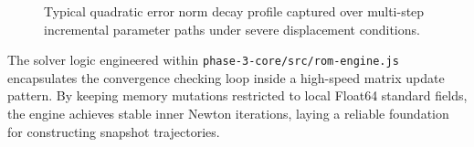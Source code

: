 \begin{figure}[H]
    \centering
    \vspace{4cm}
    \caption{Typical quadratic error norm decay profile captured over multi-step incremental parameter paths under severe displacement conditions.}
    \label{fig:nr_convergence}
\end{figure}

\begin{devnote}
The solver logic engineered within \texttt{phase-3-core/src/rom-engine.js} encapsulates the convergence checking loop inside a high-speed matrix update pattern. By keeping memory mutations restricted to local Float64 standard fields, the engine achieves stable inner Newton iterations, laying a reliable foundation for constructing snapshot trajectories.
\end{devnote}